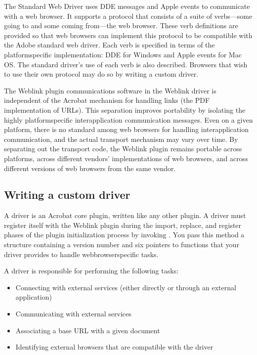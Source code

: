\documentclass[letterpaper,12pt,english,openany,oneside]{sphinxmanual}
\begin{document}
The Standard Web Driver uses DDE messages and Apple events to communicate with a web browser. It supports a protocol that consists of a suite of verbs—some going to and some coming from—the web browser. These verb definitions are provided so that web browsers can implement this protocol to be compatible with the Adobe standard web driver. Each verb is specified in terms of the platform\sphinxhyphen{}specific implementation: DDE for Windows and Apple events for Mac OS. The standard driver’s use of each verb is also described. Browsers that wish to use their own protocol may do so by writing a custom driver.

The Weblink plugin communications software in the Weblink driver is independent of the Acrobat mechanism for handling links (the PDF implementation of URLs). This separation improves portability by isolating the highly platform\sphinxhyphen{}specific interapplication communication messages. Even on a given platform, there is no standard among web browsers for handling interapplication communication, and the actual transport mechanism may vary over time. By separating out the transport code, the Weblink plugin remains portable across platforms, across different vendors’ implementations of web browsers, and across different versions of web browsers from the same vendor.


\subsection{Writing a custom driver}
\label{\detokenize{Plugins_ExtendedAPI:writing-a-custom-driver}}
A driver is an Acrobat core plugin, written like any other plugin. A driver must register itself with the Weblink plugin during the import, replace, and register phases of the plugin initialization process by invoking . You pass this method a  structure containing a version number and six pointers to functions that your driver provides to handle web\sphinxhyphen{}browser\sphinxhyphen{}specific tasks.

A driver is responsible for performing the following tasks:
\begin{itemize}
\item {} 
Connecting with external services (either directly or through an external application)

\item {} 
Communicating with external services

\item {} 
Associating a base URL with a given document

\item {} 
Identifying external browsers that are compatible with the driver

\end{itemize}
\end{document}
